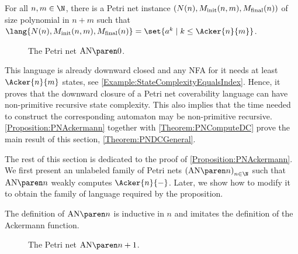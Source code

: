 \documentclass[../../diss.tex]{subfiles}
\begin{document}
\begin{proposition}%
\label{Proposition:PNAckermann}%
     For all $n, m \in \N$, there is a Petri net instance $( N(n), M_{\text{init}}(n,m), M_{\text{final}}(n) )$ of size polynomial in $n + m$ such that
     $\lang{ N(n), \Minit(n,m), \Mfinal(n) } = \set{ a^k \mid k \leq \Acker{n}{m} }$.
\end{proposition}

\begin{figure}[hb!]
    \centering%
    \caption{The Petri net $\AckerNet{0}$.}%
    \label{AckerNetBaseCase}%
\end{figure}

This language is already downward closed and any NFA for it needs at least $\Acker{n}{m}$ states, see \cref{Example:StateComplexityEqualsIndex}.
Hence, it proves that the downward closure of a Petri net coverability language can have non-primitive recursive state complexity.
This also implies that the time needed to construct the corresponding automaton may be non-primitive recursive.
\cref{Proposition:PNAckermann} together with \cref{Theorem:PNComputeDC} prove the main result of this section, \cref{Theorem:PNDCGeneral}.

The rest of this section is dedicated to the proof of \cref{Proposition:PNAckermann}.
We first present an unlabeled family of Petri nets ${(\AckerNet{n})}_{n \in \N}$ such that $\AckerNet{n}$ weakly computes $\Acker{n}{-}$.
Later, we show how to modify it to obtain the family of language required by the proposition.

The definition of $\AckerNet{n}$ is inductive in $n$ and imitates the definition of the Ackermann function.

\begin{figure*}[ht!]
    \centering%
    \caption{The Petri net $\AckerNet{n+1}$.}%
    \label{AckerNetStep}%
\end{figure*}
\end{document}
